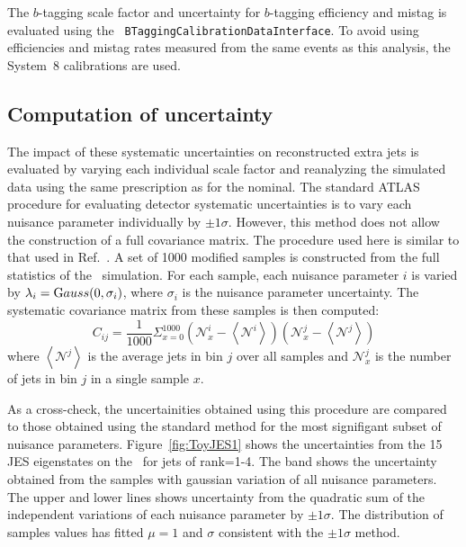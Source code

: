 The $b$-tagging scale factor and uncertainty for $b$-tagging efficiency and mistag is evaluated using the \texttt{ BTaggingCalibrationDataInterface}. To avoid using efficiencies and mistag rates measured from the same events as this analysis, the System~8 calibrations
are used.


\subsection{Computation of uncertainty}

The impact of these systematic uncertainties on reconstructed extra jets is evaluated by varying each individual scale factor and reanalyzing the simulated data using the same prescription as for the nominal. The standard ATLAS procedure for evaluating detector systematic uncertainties is to vary each nuisance parameter individually by $\pm 1\sigma$. However, this method does not allow the construction of a full covariance matrix. The procedure used here is similar to that used in Ref.~\cite{Bell:1470588}. A set of 1000 modified samples is constructed from the full statistics of the \powpy\ simulation. For each sample, each nuisance parameter $i$ is varied by $\lambda_i ={\textrm Gauss}(0, \sigma_i)$, where $\sigma_i$ is the nuisance parameter uncertainty. The systematic covariance matrix from these samples is then computed:
\begin{equation}
C_{ij}=\frac{1}{1000} \Sigma_{x=0}^{1000} \left({\mathscr N}_x^i- \left \langle{\mathscr N}^i \right \rangle \right) \left({\mathscr N}_x^j- \left \langle{\mathscr N}^j \right \rangle \right)
\label{eqn:cov}
\end{equation}
where $\left \langle{\mathscr N}^j \right \rangle$ is the average jets in bin $j$ over all samples and ${\mathscr N}_x^j$ is the number of jets in bin $j$ in a single sample $x$. 

As a cross-check, the uncertainities obtained using this procedure are compared to those obtained using the standard method for the most signifigant subset of nuisance parameters. Figure~\ref{fig:ToyJES1} shows the uncertainties from the 15 JES eigenstates on the \pt\ for jets of rank=1-4. The band shows the uncertainty obtained from the samples with gaussian variation of all nuisance parameters. The upper and lower lines shows uncertainty from the quadratic sum of the independent variations of each nuisance parameter by $\pm 1 \sigma$. The distribution of samples values has fitted $\mu=1$ and $\sigma$ consistent with the $\pm 1 \sigma$ method.





